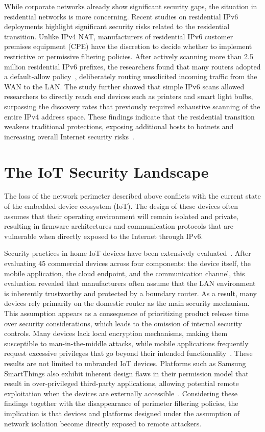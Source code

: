 While corporate networks already show significant security gaps, the situation in residential networks is more concerning. Recent studies on residential IPv6 deployments highlight significant security risks related to the residential transition. Unlike IPv4 NAT, manufacturers of residential IPv6 customer premises equipment (CPE) have the discretion to decide whether to implement restrictive or permissive filtering policies. After actively scanning more than 2.5 million residential IPv6 prefixes, the researchers found that many routers adopted a default-allow policy~\cite{rye2025firewalls}, deliberately routing unsolicited incoming traffic from the WAN to the LAN. The study further showed that simple IPv6 scans allowed researchers to directly reach end devices such as printers and smart light bulbs, surpassing the discovery rates that previously required exhaustive scanning of the entire IPv4 address space. These findings indicate that the residential transition weakens traditional protections, exposing additional hosts to botnets and increasing overall Internet security risks~\cite{rye2025firewalls}.

\section{The IoT Security Landscape}\label{sec:iot-landscape}
The loss of the network perimeter described above conflicts with the current state of the embedded device ecosystem (IoT). The design of these devices often assumes that their operating environment will remain isolated and private, resulting in firmware architectures and communication protocols that are vulnerable when directly exposed to the Internet through IPv6.

Security practices in home IoT devices have been extensively evaluated~\cite{alrawi2019sok}. After evaluating 45 commercial devices across four components: the device itself, the mobile application, the cloud endpoint, and the communication channel, this evaluation revealed that manufacturers often assume that the LAN environment is inherently trustworthy and protected by a boundary router. As a result, many devices rely primarily on the domestic router as the main security mechanism. This assumption appears as a consequence of prioritizing product release time over security considerations, which leads to the omission of internal security controls. Many devices lack local encryption mechanisms, making them susceptible to man-in-the-middle attacks, while mobile applications frequently request excessive privileges that go beyond their intended functionality~\cite{alrawi2019sok}. These results are not limited to unbranded IoT devices. Platforms such as Samsung SmartThings also exhibit inherent design flaws in their permission model that result in over-privileged third-party applications, allowing potential remote exploitation when the devices are externally accessible~\cite{fernandes2016smarthome}. Considering these findings together with the disappearance of perimeter filtering policies, the implication is that devices and platforms designed under the assumption of network isolation become directly exposed to remote attackers.

